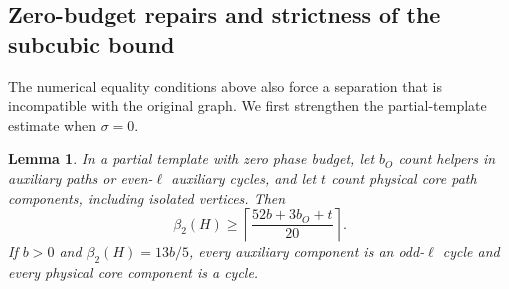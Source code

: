 \documentclass[11pt]{article}
\newtheorem{lemma}[theorem]{Lemma}
\newcommand{\diss}{\beta_2}
\begin{document}
\subsection{Zero-budget repairs and strictness of the subcubic bound}

The numerical equality conditions above also force a separation that
is incompatible with the original graph. We first strengthen the
partial-template estimate when $\sigma=0$.

\begin{lemma}\label{lem:zero-budget-repair}
In a partial template with zero phase budget, let $b_O$ count helpers
in auxiliary paths or even-$\ell$ auxiliary cycles, and let $t$ count
physical core path components, including isolated vertices. Then
\[
 \diss(H)\ge\left\lceil\frac{52b+3b_O+t}{20}\right\rceil.
\]
If $b>0$ and $\diss(H)=13b/5$, every auxiliary component is an
odd-$\ell$ cycle and every physical core component is a cycle.
\end{lemma}
\end{document}
